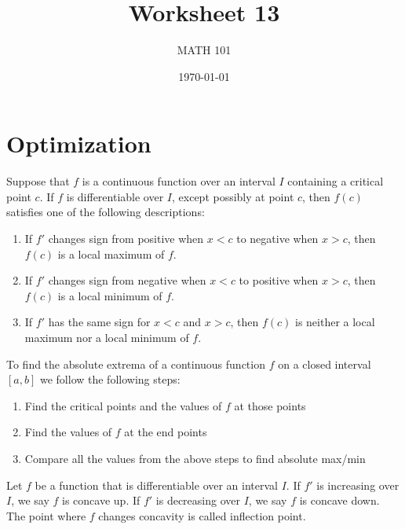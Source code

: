 \documentclass[12pt]{amsart}
\title{ Worksheet 13}
\author{MATH 101}
\date{\today}
\begin{document}
\maketitle



\section*{Optimization}


\begin{theorem}
	Suppose that $f$ is a continuous function over an interval $I$ containing a critical point \( c \). If \( f \) is differentiable over \( I \), except possibly at point \( c \), then \( f(c) \) satisfies one of the following descriptions:

	\begin{enumerate}
		\item If \( f' \) changes sign from positive when \( x < c \) to negative when \( x > c \), then \( f(c) \) is a local maximum of \( f \).
		\item If \( f' \) changes sign from negative when \( x < c \) to positive when \( x > c \), then \( f(c) \) is a local minimum of \( f \).
		\item If \( f' \) has the same sign for \( x < c \) and \( x > c \), then \( f(c) \) is neither a local maximum nor a local minimum of \( f \).
	\end{enumerate}
\end{theorem}

\begin{theorem}
	To find the absolute extrema of a continuous function $f$ on a closed interval $[a,b]$ we follow the
	following steps:
	\begin{enumerate}
		\item Find the critical points and the values of $f$ at those points
		\item Find the values of $f$ at the end points
		\item Compare all the values from the above steps to find absolute max/min
	\end{enumerate}

\end{theorem}

\begin{definition}
	Let $f$ be a function that is differentiable over an interval $I$.
	If $f'$ is increasing over $I$, we say $f$ is concave up.
	If $f'$ is decreasing over $I$, we say $f$ is concave down.
	The point where $f$ changes concavity is called inflection point.
\end{definition}
\end{document}
